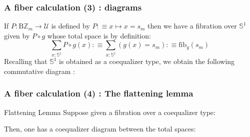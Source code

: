 \documentclass{beamer}
\begin{document}
    \begin{frame}[fragile]
        \frametitle{A fiber calculation (3) : diagrams}
        If $P : \mathrm{B}\mathbb{Z}_m \rightarrow \mathcal{U}$ is defined by $P :\equiv x \mapsto  x = s_m$ then we have a fibration over $\mathbb{S}^1$ given by $P \circ g$ whose total space is by definition:
        $$\sum_{x : \mathbb{S}^1} P \circ g (x) :\equiv \sum_{x : \mathbb{S}^1}(g(x)=s_m) :\equiv \mathrm{fib}_g(s_m)$$
        \pause 
        Recalling that $\mathbb{S}^1$ is obtained as a coequalizer type, we obtain the following commutative diagram : 
        \begin{center}
          \end{center}
    \end{frame}
    \begin{frame}[fragile]
        \frametitle{A fiber calculation (4) : The flattening lemma}
        \begin{alertblock}{Flattening Lemma}
            Suppose given a fibration over a coequalizer type: 
            \begin{center}
            \end{center}
            Then, one has a coequalizer diagram between the total spaces: 
            \begin{center}
            \end{center}
          \end{alertblock}
    \end{frame}
\end{document}
